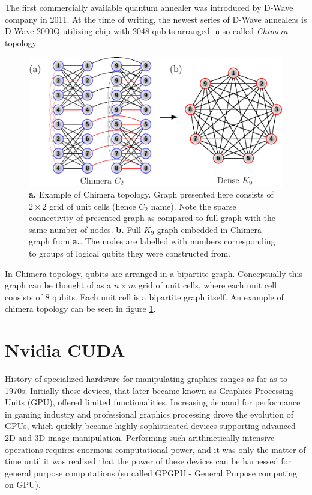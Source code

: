 The first commercially available quantum annealer was introduced by D-Wave company in 2011. At the time of writing, the newest series of D-Wave annealers is D-Wave 2000Q  utilizing chip with 2048 qubits arranged in so called \emph{Chimera} topology.

\begin{figure}[h]
    \centering
    \includegraphics[width=\textwidth]{figures/chimera.pdf}
    \caption{\textbf{a.} Example of Chimera topology. Graph presented here consists of $2 \times 2$ grid of unit cells (hence $C_2$ name). Note the sparse connectivity of presented graph as compared to full graph with the same number of nodes. \textbf{b.} Full $K_9$ graph embedded in Chimera graph from \textbf{a.}. The nodes are labelled with numbers corresponding to groups of logical qubits they were constructed from.}
    \label{fig:chimera}
\end{figure}

In Chimera topology, qubits are arranged in a bipartite graph. Conceptually this graph can be thought of as a $n \times m$ grid of unit cells, where each unit cell consists of $8$ qubits. Each unit cell is a bipartite graph itself. An example of chimera topology can be seen in figure \ref{fig:chimera}.

\section{Nvidia CUDA}
History of specialized hardware for manipulating graphics ranges as far as to 1970s. Initially these devices, that later became known as Graphics Processing Units (GPU), offered limited functionalities. Increasing demand for performance in gaming industry and professional graphics processing drove the evolution of GPUs, which quickly became highly sophisticated devices supporting advanced 2D and 3D image manipulation. Performing such arithmetically intensive operations requires enormous computational power, and it was only the matter of time until it was realised that the power of these devices can be harnessed for general purpose computations (so called GPGPU - General Purpose computing on GPU). 


